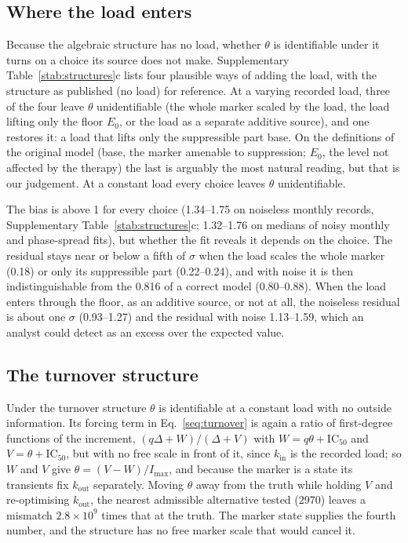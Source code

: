 \subsection{Where the load enters}
\label{si:s3:load}

Because the algebraic structure has no load, whether $\theta$ is identifiable under it turns on a
choice its source does not make. Supplementary Table~\ref{stab:structures}c lists four plausible
ways of adding the load, with the structure as published (no load) for reference. At a varying
recorded load, three of the four leave $\theta$ unidentifiable (the whole marker scaled by the
load, the load lifting only the floor $E_0$, or the load as a separate additive source), and one
restores it: a load that lifts only the suppressible part base. On the definitions of the original
model (base, the marker amenable to suppression; $E_0$, the level not affected by the therapy) the
last is arguably the most natural reading, but that is our judgement. At a constant load every
choice leaves $\theta$ unidentifiable.

The bias is above 1 for every choice (1.34--1.75 on noiseless monthly records,
Supplementary Table~\ref{stab:structures}c; 1.32--1.76 on medians of noisy monthly and
phase-spread fits), but whether the fit reveals it depends on the choice. The residual stays near
or below a fifth of $\sigma$ when the load scales the whole marker (0.18) or only its suppressible part (0.22--0.24), and with noise it is
then indistinguishable from the 0.816 of a correct model (0.80--0.88). When the load enters
through the floor, as an additive source, or not at all, the noiseless residual is about one
$\sigma$ (0.93--1.27) and the residual with noise 1.13--1.59, which an analyst could detect as an
excess over the expected value.

\subsection{The turnover structure}
\label{si:s3:turnover}

Under the turnover structure $\theta$ is identifiable at a constant load with no outside
information. Its forcing term in Eq.~\eqref{seq:turnover} is again a ratio of first-degree
functions of the increment, $(q\Delta+W)/(\Delta+V)$ with $W=q\theta+\mathrm{IC}_{50}$ and
$V=\theta+\mathrm{IC}_{50}$, but with no free scale in front of it, since $k_{\mathrm{in}}$ is the
recorded load; so $W$ and $V$ give $\theta=(V-W)/I_{\max}$, and because the marker is a state its
transients fix $k_{\mathrm{out}}$ separately. Moving $\theta$ away from the truth while holding $V$
and re-optimising $k_{\mathrm{out}}$, the nearest admissible alternative tested (2970\um) leaves
a mismatch $2.8\times10^9$ times that at the truth. The marker state supplies the fourth number,
and the structure has no free marker scale that would cancel it.

